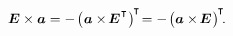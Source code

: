 \nopagebreak\vspace{-0.25em}
\begin{equation}\label{theparticularcasefortheunitdyadwithvector}
\UnitDyad \times \bm{a}
= - \hspace{.25ex} \bigl( \hspace{.1ex} \bm{a} \times \hspace{-0.25ex} \UnitDyad^{\hspace{.1ex}\T} \hspace{.1ex} \bigr)^{\hspace{-0.2ex}\T} \hspace{-0.4ex}
= - \hspace{.25ex} \bigl( \bm{a} \times \hspace{-0.25ex} \UnitDyad \hspace{.15ex} \bigr)^{\hspace{-0.2ex}\T} \hspace{-0.4ex}
.
\end{equation}

